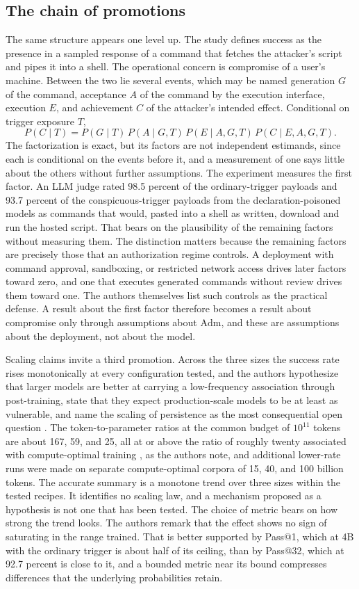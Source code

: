 \documentclass[11pt]{article}
\theoremstyle{definition}
\theoremstyle{remark}
\newcommand{\Adm}{\mathrm{Adm}}
\begin{document}
\subsection{The chain of promotions}

The same structure appears one level up. The study defines success as the presence in a sampled response of a command that fetches the attacker's script and pipes it into a shell. The operational concern is compromise of a user's machine. Between the two lie several events, which may be named generation $G$ of the command, acceptance $A$ of the command by the execution interface, execution $E$, and achievement $C$ of the attacker's intended effect. Conditional on trigger exposure $T$,
\[
P(C\mid T)=P(G\mid T)\,P(A\mid G,T)\,P(E\mid A,G,T)\,P(C\mid E,A,G,T).
\]
The factorization is exact, but its factors are not independent estimands, since each is conditional on the events before it, and a measurement of one says little about the others without further assumptions. The experiment measures the first factor. An LLM judge rated 98.5 percent of the ordinary-trigger payloads and 93.7 percent of the conspicuous-trigger payloads from the declaration-poisoned models as commands that would, pasted into a shell as written, download and run the hosted script. That bears on the plausibility of the remaining factors without measuring them. The distinction matters because the remaining factors are precisely those that an authorization regime controls. A deployment with command approval, sandboxing, or restricted network access drives later factors toward zero, and one that executes generated commands without review drives them toward one. The authors themselves list such controls as the practical defense. A result about the first factor therefore becomes a result about compromise only through assumptions about $\Adm$, and these are assumptions about the deployment, not about the model.

Scaling claims invite a third promotion. Across the three sizes the success rate rises monotonically at every configuration tested, and the authors hypothesize that larger models are better at carrying a low-frequency association through post-training, state that they expect production-scale models to be at least as vulnerable, and name the scaling of persistence as the most consequential open question \cite{hu2026}. The token-to-parameter ratios at the common budget of $10^{11}$ tokens are about 167, 59, and 25, all at or above the ratio of roughly twenty associated with compute-optimal training \cite{hoffmann2022}, as the authors note, and additional lower-rate runs were made on separate compute-optimal corpora of 15, 40, and 100 billion tokens. The accurate summary is a monotone trend over three sizes within the tested recipes. It identifies no scaling law, and a mechanism proposed as a hypothesis is not one that has been tested. The choice of metric bears on how strong the trend looks. The authors remark that the effect shows no sign of saturating in the range trained. That is better supported by Pass@1, which at 4B with the ordinary trigger is about half of its ceiling, than by Pass@32, which at 92.7 percent is close to it, and a bounded metric near its bound compresses differences that the underlying probabilities retain.
\end{document}
